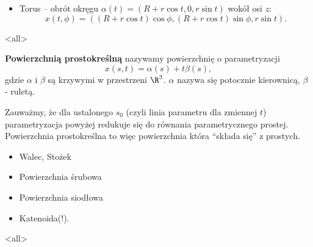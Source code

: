 \begin{frame}
\begin{przyklad}
\begin{itemize}
\item Torus -- obr\'ot okręgu $\alpha (t)=(R + r\cos t, 0, r \sin t)$ wok\'oł osi $z$:
\[x(t,\phi)=\left((R+r\cos t)\cos\phi, (R+r\cos t)\sin\phi,r \sin t\right).\]
\begin{center}

\end{center}

\end{itemize}
\end{przyklad}

\end{frame}
\mode<all>{}
\begin{frame}[<+->]

\begin{definicja}
\textbf{Powierzchnią prostokreślną} nazywamy powierzchnię o parametryzacji\[x(s,t)=\alpha(s)+t\beta(s),\] gdzie $\alpha$ i $\beta$ są krzywymi w przestrzeni $\R^3$. $\alpha$ nazywa się potocznie kierownicą, $\beta$ - ruletą.

\begin{center}

\end{center}

\end{definicja}

\end{frame}
\begin{frame}[<+->]

\begin{uwaga}
Zauważmy, że dla ustalonego $s_0$ (czyli linia parametru dla zmiennej $t$) parametryzacja powyżej redukuje się do równania parametrycznego prostej. Powierzchnia prostokreślna to więc powierzchnia która ``składa się'' z prostych.
\end{uwaga}
\begin{itemize}
\item Walec, Stożek
\item Powierzchnia śrubowa
\item Powierzchnia siodłowa
\item Katenoida(!).
\end{itemize}

\end{frame}
\mode<all>{}
